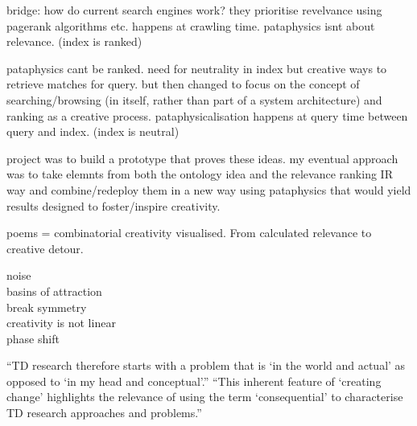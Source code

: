 bridge: how do current search engines work? they prioritise revelvance using pagerank algorithms etc. happens at crawling time. pataphysics isnt about relevance. (index is ranked)

pataphysics cant be ranked. need for neutrality in index but creative ways to retrieve matches for query.
but then changed to focus on the concept of searching/browsing (in itself, rather than part of a system architecture) and ranking as a creative process.
pataphysicalisation happens at query time between query and index. (index is neutral)

project was to build a prototype that proves these ideas.
my eventual approach was to take elemnts from both the ontology idea and the relevance ranking IR way and combine/redeploy them in a new way using pataphysics that would yield results designed to foster/inspire creativity.


\begin{fcom}
  poems = combinatorial creativity visualised.
  From calculated relevance to creative detour.
\end{fcom}

\begin{fcom}
  noise\\
  basins of attraction\\
  break symmetry\\
  creativity is not linear\\
  phase shift\\
  \autocite{Everitt2011}
\end{fcom}

\grule


``TD research therefore starts with a problem that is `in the world and actual' as opposed to `in my head and conceptual'.'' ``This inherent feature of `creating change' highlights the relevance of using the term `consequential' to characterise TD research approaches and problems.'' \autocite{Wickson2006}


